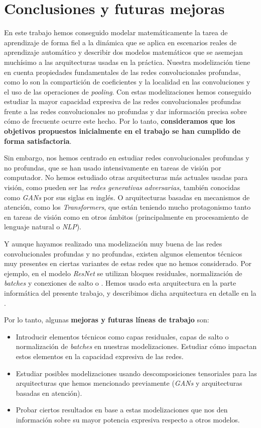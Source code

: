 \chapter{Conclusiones y futuras mejoras} \label{chapter:conclusiones_trabajo_futuro}

En este trabajo hemos conseguido modelar matemáticamente la tarea de aprendizaje de forma fiel a la dinámica que se aplica en escenarios reales de aprendizaje automático y describir dos modelos matemáticos que se asemejan muchísimo a las arquitecturas usadas en la práctica. Nuestra modelización tiene en cuenta propiedades fundamentales de las redes convolucionales profundas, como lo son la compartición de coeficientes y la localidad en las convoluciones y el uso de las operaciones de \textit{pooling}. Con estas modelizaciones hemos conseguido estudiar la mayor capacidad expresiva de las redes convolucionales profundas frente a las redes convolucionales no profundas y dar información precisa sobre cómo de frecuente ocurre este hecho. Por lo tanto, \textbf{consideramos que los objetivos propuestos inicialmente en el trabajo se han cumplido de forma satisfactoria}.

Sin embargo, nos hemos centrado en estudiar redes convolucionales profundas y no profundas, que se han usado intensivamente en tareas de visión por computador. No hemos estudiado otras arquitecturas más actuales usadas para visión, como pueden ser las \textit{redes generativas adversarias}, también conocidas como \textit{GANs} por sus siglas en inglés. O arquitecturas basadas en mecanismos de atención, como los \textit{Transformers}, que están teniendo mucho protagonismo tanto en tareas de visión como en otros ámbitos (principalmente en procesamiento de lenguaje natural o \textit{NLP}).

Y aunque hayamos realizado una modelización muy buena de las redes convolucionales profundas y no profundas, existen algunos elementos técnicos muy presentes en ciertas variantes de estas redes que no hemos considerado. Por ejemplo, en el modelo \textit{ResNet} se utilizan bloques residuales, normalización de \textit{batches} y conexiones de salto o . Hemos usado esta arquitectura en la parte informática del presente trabajo, y describimos dicha arquitectura en detalle en la .

Por lo tanto, algunas \textbf{mejoras y futuras líneas de trabajo} son:

\begin{itemize}
	\item Introducir elementos técnicos como capas residuales, capas de salto o normalización de \textit{batches} en nuestras modelizaciones. Estudiar cómo impactan estos elementos en la capacidad expresiva de las redes.
	\item Estudiar posibles modelizaciones usando descomposiciones tensoriales para las arquitecturas que hemos mencionado previamente (\textit{GANs} y arquitecturas basadas en atención).
	\item Probar ciertos resultados en base a estas modelizaciones que nos den información sobre su mayor potencia expresiva respecto a otros modelos.
\end{itemize}
